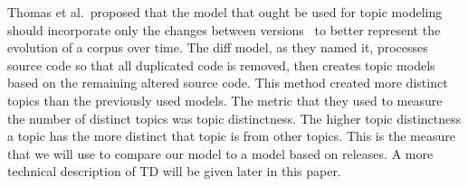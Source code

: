 Thomas et al.\ proposed that the model that ought be used for topic modeling should incorporate only the changes between versions~\cite{Thomas-etal:2011} to better represent the evolution of a corpus over time.
The diff model, as they named it, processes source code so that all duplicated code is removed, then creates topic models based on the remaining altered source code.
This method created more distinct topics than the previously used models.
The metric that they used to measure the number of distinct topics was topic distinctness.
The higher topic distinctness a topic has the more distinct that topic is from other topics.
This is the measure that we will use to compare our model to a model based on releases.
A more technical description of TD will be given later in this paper.

